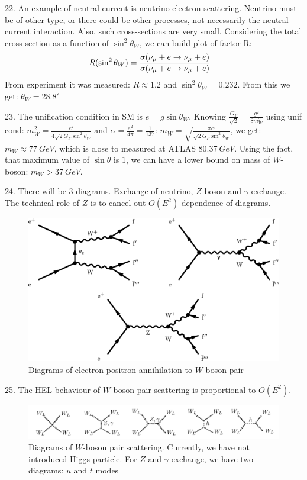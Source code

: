 22. An example of neutral current is neutrino-electron scattering. Neutrino must be of other type, or there could be other processes, not necessarily the neutral current interaction. Also, such cross-sections are very small. Considering the total cross-section as a function of $\sin^2 \theta_W$, we can build plot of factor R:
\begin{equation}
\begin{split}
&R(\sin^2 \theta_W)=\frac{\sigma( \nu_\mu +e\rightarrow \nu_\mu +e )  }{\sigma( \Bar{\nu}_\mu +e\rightarrow \Bar{\nu}_\mu +e )}
\end{split}
\end{equation}
From experiment it was measured: $R\approx 1.2$ and $\sin^2 \theta_W=0.232$. From this we get: $\theta_W=28.8'$

23. The unification condition in SM is $e=g\sin \theta_W$. Knowing $\frac{G_F}{\sqrt{2}}=\frac{g^2}{8 m_W^2}$ using unif cond: $m_W^2=\frac{e^2}{4\sqrt{2} G_F\sin^2\theta_W}$ and $\alpha = \frac{e^2}{4\pi}=\frac{1}{137}$: $m_W = \sqrt{\frac{\pi\alpha}{\sqrt{2}G_F\sin^2\theta_W}}$, we get: $m_W\approx 77\ GeV$, which is close to measured at ATLAS $80.37\ GeV$. Using the fact, that maximum value of $\sin \theta $ is $1$, we can have a lower bound on mass of $W$-boson: $m_W > 37 \ GeV$.

24. There will be 3  diagrams. Exchange of neutrino, $Z$-boson and $\gamma$ exchange. The technical role of $Z$ is to cancel out $O(E^2)$ dependence of diagrams. 
\begin{figure}[H]
\centering
\includegraphics[width=\textwidth]{Images/ElectronPositronAnnihilationToWBosons}
\caption{Diagrams of electron positron annihilation to $W$-boson pair}
\end{figure}

25. The HEL behaviour of $W$-boson pair scattering is proportional to $O(E^2)$.
\begin{figure}[H]
\centering
\includegraphics[width=\textwidth]{Images/WLWL.png}
\caption{Diagrams of $W$-boson pair scattering. Currently, we have not introduced Higgs particle. For $Z$ and $\gamma$ exchange, we have two diagrams: $u$ and $t$ modes}
\end{figure}

